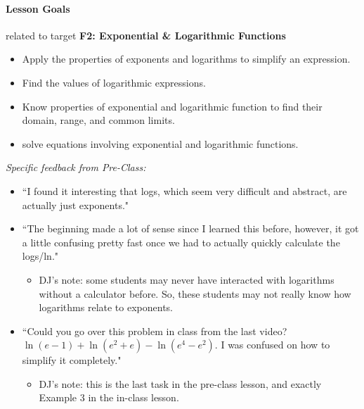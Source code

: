 \documentclass[10pt]{article}
\begin{document}
\pagestyle{otherpages}
\thispagestyle{firstpage}

\paragraph*{Lesson Goals} related to target {\bf\color{ProcessBlue} F2: Exponential \& Logarithmic Functions}
\begin{itemize}
    \item Apply the properties of exponents and logarithms to simplify an expression. 
    \item Find the values of logarithmic expressions.
    \item Know properties of exponential and logarithmic function to find their domain, range, and common limits.
    \item solve equations involving exponential and logarithmic functions.
\end{itemize}


{\it Specific feedback from Pre-Class:}
\begin{itemize}
\item ``I found it interesting that logs, which seem very difficult and abstract, are actually just exponents."
\item ``The beginning made a lot of sense since I learned this before, however, it got a little confusing pretty fast once we had to actually quickly calculate the logs/ln."
    \begin{itemize}
    \item DJ's note: some students may never have interacted with logarithms without a calculator before. So, these students may not really know how logarithms relate to exponents.
    \end{itemize}
\item ``Could you go over this problem in class from the last video? $\ln(e-1) + \ln(e^2+e) - \ln(e^4-e^2)$. I was confused on how to simplify it completely."
    \begin{itemize}
    \item DJ's note: this is the last task in the pre-class lesson, and exactly Example 3 in the in-class lesson.
    \end{itemize}
\end{itemize}
\end{document}
